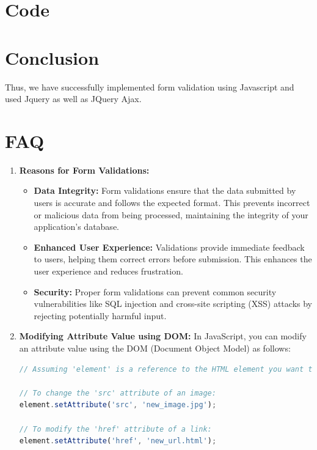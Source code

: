 \documentclass[11pt]{article}
\begin{document}
\section{Code}


\section{Conclusion}
Thus, we have successfully implemented form validation using Javascript and used Jquery as well as JQuery Ajax.
\clearpage

\section{FAQ}
\begin{enumerate}
    \item \textbf{Reasons for Form Validations:}
          \begin{itemize}
              \item \textbf{Data Integrity:} Form validations ensure that the data submitted by users is accurate and follows the expected format. This prevents incorrect or malicious data from being processed, maintaining the integrity of your application's database.
              \item \textbf{Enhanced User Experience:} Validations provide immediate feedback to users, helping them correct errors before submission. This enhances the user experience and reduces frustration.
              \item \textbf{Security:} Proper form validations can prevent common security vulnerabilities like SQL injection and cross-site scripting (XSS) attacks by rejecting potentially harmful input.
          \end{itemize}

    \item \textbf{Modifying Attribute Value using DOM:} In JavaScript, you can modify an attribute value using the DOM (Document Object Model) as follows:
          \begin{lstlisting}[language=JavaScript, caption=Example: Modifying Attribute Value using DOM]
// Assuming 'element' is a reference to the HTML element you want to modify.

// To change the 'src' attribute of an image:
element.setAttribute('src', 'new_image.jpg');

// To modify the 'href' attribute of a link:
element.setAttribute('href', 'new_url.html');
        \end{lstlisting}



\end{enumerate}
\end{document}
